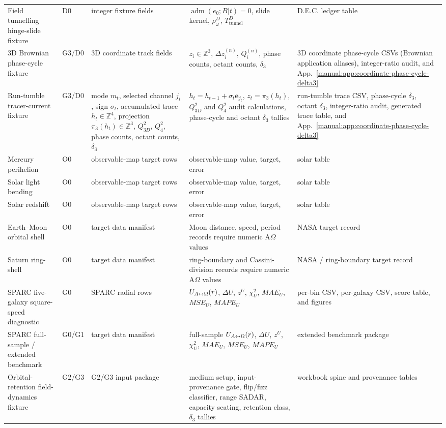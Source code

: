 \begin{longtable}{@{}p{}p{}p{}p{}p{}@{}}
Field tunnelling hinge-slide fixture & D0 & integer fixture fields & $\operatorname{adm}(e_0;B|t)=0$, slide kernel, $\rho^D_\omega$, $T^D_{\mathrm{tunnel}}$ & D.E.C. ledger table\\
3D Brownian phase-cycle fixture & G3/D0 & 3D coordinate track fields & $z_i\in\mathbb Z^3$, $\Delta z_i^{(n)}$, $Q_i^{(n)}$, phase counts, octant counts, $\delta_3$ & 3D coordinate phase-cycle CSVs (Brownian application aliases), integer-ratio audit, and App.~\ref{manual:app:coordinate-phase-cycle-delta3}\\
Run-tumble tracer-current fixture & G3/D0 & mode $m_t$, selected channel $j_t$, sign $\sigma_t$, accumulated trace $h_t\in\mathbb Z^4$, projection $\pi_3(h_t)\in\mathbb Z^3$, $Q^2_{3D}$, $Q^2_4$, phase counts, octant counts, $\delta_3$ & $h_t=h_{t-1}+\sigma_t\mathbf e_{j_t}$, $z_t=\pi_3(h_t)$, $Q^2_{3D}$ and $Q^2_4$ audit calculations, phase-cycle and octant $\delta_3$ tallies & run-tumble trace CSV, phase-cycle $\delta_3$, octant $\delta_3$, integer-ratio audit, generated trace table, and App.~\ref{manual:app:coordinate-phase-cycle-delta3}\\
Mercury perihelion & O0 & observable-map target rows & observable-map value, target, error & solar table\\
Solar light bending & O0 & observable-map target rows & observable-map value, target, error & solar table\\
Solar redshift & O0 & observable-map target rows & observable-map value, target, error & solar table\\
Earth--Moon orbital shell & O0 & target data manifest & Moon distance, speed, period records require numeric A\(\Omega\) values & NASA target record\\
Saturn ring-shell & O0 & target data manifest & ring-boundary and Cassini-division records require numeric A\(\Omega\) values & NASA / ring-boundary target record\\
SPARC five-galaxy square-speed diagnostic & G0 & SPARC radial rows & $U_{A{\leftrightarrow}\Omega}(r)$, $\Delta U$, $z^U$, $\chi^2_U$, $MAE_U$, $MSE_U$, $MAPE_U$ & per-bin CSV, per-galaxy CSV, score table, and figures\\
SPARC full-sample / extended benchmark & G0/G1 & target data manifest & full-sample $U_{A{\leftrightarrow}\Omega}(r)$, $\Delta U$, $z^U$, $\chi^2_U$, $MAE_U$, $MSE_U$, $MAPE_U$ & extended benchmark package\\
Orbital-retention field-dynamics fixture & G2/G3 & G2/G3 input package & medium setup, input-provenance gate, flip/fizz classifier, range SADAR, capacity seating, retention class, \(\delta_3\) tallies & workbook spine and provenance tables\\

\end{longtable}

